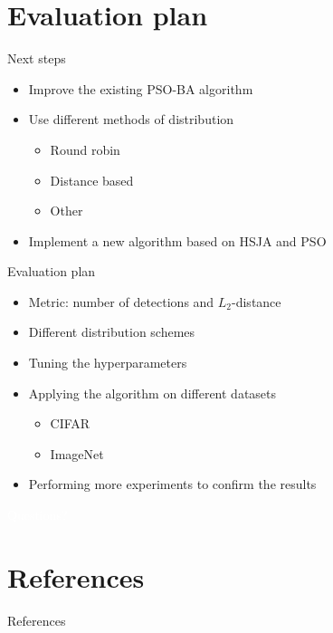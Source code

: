 \documentclass[11pt,t]{beamer}
\begin{document}
\section{Evaluation plan}
\begin{frame}{Next steps}
\begin{itemize}
	\item Improve the existing PSO-BA algorithm
	\item Use different methods of distribution
	\begin{itemize}
		\item Round robin 
		\item Distance based
		\item Other
	\end{itemize}
	\item Implement a new algorithm based on HSJA and PSO
\end{itemize}
\end{frame}

\begin{frame}{Evaluation plan}
\begin{itemize}
	\item Metric: number of detections and $L_2$-distance
	\item Different distribution schemes
	\item Tuning the hyperparameters
	\item Applying the algorithm on different datasets
	\begin{itemize}
		\item CIFAR
		\item ImageNet
	\end{itemize}
	\item Performing more experiments to confirm the results
\end{itemize}
\end{frame}

\begin{frame}

\centering
\textcolor{white}{Questions?}
\end{frame}

\appendix
\section*{References}
\begin{frame}[allowframebreaks]{References}


\end{frame}
\end{document}
